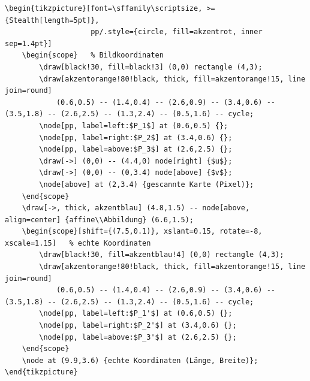 \begin{lstlisting}[style=latex]
\begin{tikzpicture}[font=\sffamily\scriptsize, >={Stealth[length=5pt]},
                    pp/.style={circle, fill=akzentrot, inner sep=1.4pt}]
	\begin{scope}   % Bildkoordinaten
		\draw[black!30, fill=black!3] (0,0) rectangle (4,3);
		\draw[akzentorange!80!black, thick, fill=akzentorange!15, line join=round]
			(0.6,0.5) -- (1.4,0.4) -- (2.6,0.9) -- (3.4,0.6) -- (3.5,1.8) -- (2.6,2.5) -- (1.3,2.4) -- (0.5,1.6) -- cycle;
		\node[pp, label=left:$P_1$] at (0.6,0.5) {};
		\node[pp, label=right:$P_2$] at (3.4,0.6) {};
		\node[pp, label=above:$P_3$] at (2.6,2.5) {};
		\draw[->] (0,0) -- (4.4,0) node[right] {$u$};
		\draw[->] (0,0) -- (0,3.4) node[above] {$v$};
		\node[above] at (2,3.4) {gescannte Karte (Pixel)};
	\end{scope}
	\draw[->, thick, akzentblau] (4.8,1.5) -- node[above, align=center] {affine\\Abbildung} (6.6,1.5);
	\begin{scope}[shift={(7.5,0.1)}, xslant=0.15, rotate=-8, xscale=1.15]   % echte Koordinaten
		\draw[black!30, fill=akzentblau!4] (0,0) rectangle (4,3);
		\draw[akzentorange!80!black, thick, fill=akzentorange!15, line join=round]
			(0.6,0.5) -- (1.4,0.4) -- (2.6,0.9) -- (3.4,0.6) -- (3.5,1.8) -- (2.6,2.5) -- (1.3,2.4) -- (0.5,1.6) -- cycle;
		\node[pp, label=left:$P_1'$] at (0.6,0.5) {};
		\node[pp, label=right:$P_2'$] at (3.4,0.6) {};
		\node[pp, label=above:$P_3'$] at (2.6,2.5) {};
	\end{scope}
	\node at (9.9,3.6) {echte Koordinaten (Länge, Breite)};
\end{tikzpicture}
\end{lstlisting}


